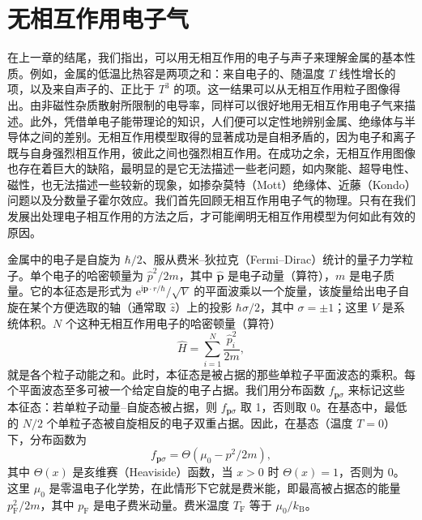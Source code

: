 \chapter{无相互作用电子气}

在上一章的结尾，我们指出，可以用无相互作用的电子与声子来理解金属的基本性质。例如，金属的低温比热容是两项之和：来自电子的、随温度 $T$ 线性增长的项，以及来自声子的、正比于 $T^{3}$ 的项。这一结果可以从无相互作用粒子图像得出。由非磁性杂质散射所限制的电导率，同样可以很好地用无相互作用电子气来描述。此外，凭借单电子能带理论的知识，人们便可以定性地辨别金属、绝缘体与半导体之间的差别。无相互作用模型取得的显著成功是自相矛盾的，因为电子和离子既与自身强烈相互作用，彼此之间也强烈相互作用。在成功之余，无相互作用图像也存在着巨大的缺陷，最明显的是它无法描述一些老问题，如内聚能、超导电性、磁性，也无法描述一些较新的现象，如掺杂莫特（Mott）绝缘体、近藤（Kondo）问题以及分数量子霍尔效应。我们首先回顾无相互作用电子气的物理。只有在我们发展出处理电子相互作用的方法之后，才可能阐明无相互作用模型为何如此有效的原因。

金属中的电子是自旋为 $\hbar/2$、服从费米–狄拉克（Fermi--Dirac）统计的量子力学粒子。单个电子的哈密顿量为 $\widehat{p}^{2}/2m$，其中 $\widehat{\mathbf{p}}$ 是电子动量（算符），$m$ 是电子质量。它的本征态是形式为 $\mathrm{e}^{\mathrm{i}\mathbf{p}\cdot r/\hbar}/\sqrt{V}$ 的平面波乘以一个旋量，该旋量给出电子自旋在某个方便选取的轴（通常取 $\hat{z}$）上的投影 $\hbar\sigma/2$，其中 $\sigma=\pm1$；这里 $V$ 是系统体积。$N$ 个这种无相互作用电子的哈密顿量（算符）
\begin{equation*}
\widehat{H}=\sum_{i=1}^{N}\frac{\widehat{p}_{i}^{2}}{2m},
\tag{2.1}
\end{equation*}
就是各个粒子动能之和。此时，本征态是被占据的那些单粒子平面波态的乘积。每个平面波态至多可被一个给定自旋的电子占据。我们用分布函数 $f_{\mathbf{p}\sigma}$ 来标记这些本征态：若单粒子动量–自旋态被占据，则 $f_{\mathbf{p}\sigma}$ 取 1，否则取 0。在基态中，最低的 $N/2$ 个单粒子态被自旋相反的电子双重占据。因此，在基态（温度 $T=0$）下，分布函数为
\begin{equation*}
f_{\mathbf{p}\sigma}=\Theta(\mu_{0}-p^{2}/2m),
\tag{2.2}
\end{equation*}
其中 $\Theta(x)$ 是亥维赛（Heaviside）函数，当 $x>0$ 时 $\Theta(x)=1$，否则为 0。这里 $\mu_{0}$ 是零温电子化学势，在此情形下它就是费米能，即最高被占据态的能量 $p_{\mathrm{F}}^{2}/2m$，其中 $p_{\mathrm{F}}$ 是电子费米动量。费米温度 $T_{\mathrm{F}}$ 等于 $\mu_{0}/k_{\mathrm{B}}$。

